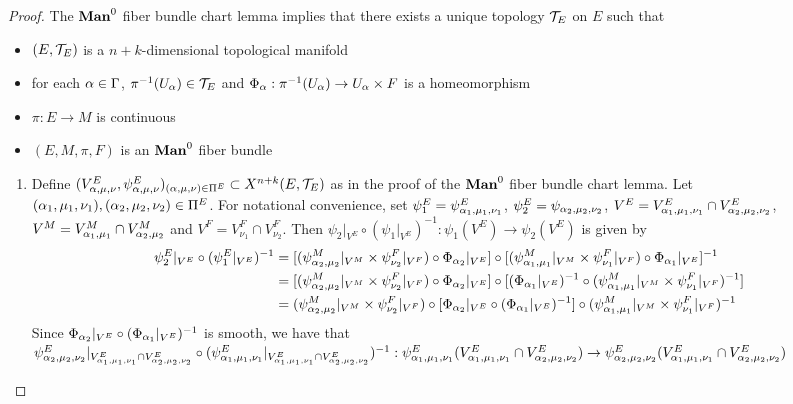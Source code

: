\documentclass{book}
\begin{document}
	\begin{proof}
		The $\Man0$ fiber bundle chart lemma implies that there exists a unique topology $\mathcal{T}_E$ on $E$ such that 
		\begin{itemize}
			\item $(E, \mathcal{T}_E)$ is a $n+k$-dimensional topological manifold 
			\item for each $\alpha \in \Gamma$, $ \pi^{-1}(U_{\alpha}) \in \mathcal{T}_E$ and $\Phi_{\alpha}: \pi^{-1}(U_{\alpha}) \rightarrow U_{\alpha} \times F$ is a homeomorphism
			\item $\pi: E \rightarrow M$ is continuous
			\item $(E, M, \pi, F)$ is an $\Man0$ fiber bundle
		\end{itemize}
		\begin{enumerate}
			\item Define $(V^E_{\alpha, \mu, \nu}, \psi^E_{\alpha, \mu, \nu})_{(\alpha, \mu, \nu) \in \Pi^E} \subset X^{n+k}(E, \mathcal{T}_E)$ as in the proof of the $\Man0$ fiber bundle chart lemma. Let $(\alpha_1, \mu_1, \nu_1), (\alpha_2, \mu_2, \nu_2) \in \Pi^E$. For notational convenience, set $\psi^E_1 = \psi^E_{\alpha_1, \mu_1, \nu_1}$, $\psi^E_2 = \psi_{\alpha_2, \mu_2, \nu_2}$, $V^E = V^E_{\alpha_1, \mu_1, \nu_1} \cap V^E_{\alpha_2, \mu_2, \nu_2}$, $V^M = V_{\alpha_1, \mu_1}^M \cap V^M_{\alpha_2, \mu_2}$ and $V^F = V^F_{\nu_1} \cap V^F_{\nu_2}$. Then $\psi_2|_{V^E} \circ (\psi_1|_{V^E})^{-1}: \psi_1(V^E) \rightarrow \psi_2(V^E)$ is given by
			\begin{align*}
				\psi^E_2|_{V^E} \circ (\psi^E_1|_{V^E})^{-1}
				& = [(\psi_{\alpha_2, \mu_2}^M|_{V^M} \times \psi_{\nu_2}^F|_{V^F}) \circ \Phi_{\alpha_2}|_{V^E}] \circ [(\psi_{\alpha_1, \mu_1}^M|_{V^M} \times \psi_{\nu_1}^F|_{V^F}) \circ \Phi_{\alpha_1}|_{V^E}]^{-1} \\
				& = [(\psi_{\alpha_2, \mu_2}^M|_{V^M} \times \psi_{\nu_2}^F|_{V^F}) \circ \Phi_{\alpha_2}|_{V^E}] \circ [(\Phi_{\alpha_1}|_{V^E})^{-1} \circ (\psi_{\alpha_1, \mu_1}^M|_{V^M} \times \psi_{\nu_1}^F|_{V^F})^{-1}] \\
				& = (\psi_{\alpha_2, \mu_2}^M|_{V^M} \times \psi_{\nu_2}^F|_{V^F}) \circ [\Phi_{\alpha_2}|_{V^E} \circ (\Phi_{\alpha_1}|_{V^E})^{-1}] \circ (\psi_{\alpha_1, \mu_1}^M|_{V^M} \times \psi_{\nu_1}^F|_{V^F})^{-1}
			\end{align*}
			Since $\Phi_{\alpha_2}|_{V^E} \circ (\Phi_{\alpha_1}|_{V^E})^{-1}$ is smooth, we have that 
			$\psi^E_{\alpha_2, \mu_2, \nu_2}|_{V^E_{\alpha_1, \mu_1, \nu_1} \cap V^E_{\alpha_2, \mu_2, \nu_2}} \circ (\psi^E_{\alpha_1, \mu_1, \nu_1}|_{V^E_{\alpha_1, \mu_1, \nu_1} \cap V^E_{\alpha_2, \mu_2, \nu_2}})^{-1}: \psi^E_{\alpha_1, \mu_1, \nu_1}(V^E_{\alpha_1, \mu_1, \nu_1} \cap V^E_{\alpha_2, \mu_2, \nu_2}) \rightarrow \psi^E_{\alpha_2, \mu_2, \nu_2}(V^E_{\alpha_1, \mu_1, \nu_1} \cap V^E_{\alpha_2, \mu_2, \nu_2})$

\end{enumerate}
\end{proof}
\end{document}
